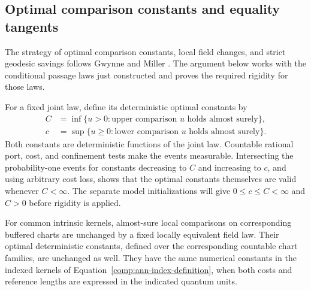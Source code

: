 \subsection{Optimal comparison constants and equality tangents}

The strategy of optimal comparison constants, local field changes,
and strict geodesic savings follows Gwynne and Miller
\cite[Section~1.5 and Sections~3--5]{GwynneMillerMetric}. The argument
below works with the conditional passage laws just constructed and
proves the required rigidity for those laws.

For a fixed joint law, define its deterministic optimal constants by
\begin{equation}\label{comp:optimal-constants}
 \begin{aligned}
 C&=\inf\{u>0:\text{upper comparison }u\text{ holds almost surely}\},\\
 c&=\sup\{u\ge0:\text{lower comparison }u\text{ holds almost surely}\}.
 \end{aligned}
\end{equation}
Both constants are deterministic functions of the joint law.
Countable rational port, cost, and confinement
tests make the events measurable.  Intersecting the probability-one
events for constants decreasing to $C$ and increasing to $c$, and
using arbitrary cost loss, shows that the optimal constants themselves
are valid whenever $C<\infty$.  The separate model initializations will
give $0\le c\le C<\infty$ and $C>0$ before rigidity is applied.

\begin{lemma}
\label{comp:comparison-transport}
For common intrinsic kernels, almost-sure local comparisons on
corresponding buffered charts are unchanged by a fixed locally
equivalent field law.  Their optimal deterministic constants, defined
over the corresponding countable chart families, are unchanged as well.
They have the same numerical constants in the
indexed kernels of Equation~\eqref{comp:ann-index-definition}, when
both costs and reference lengths are expressed in the indicated
quantum units.
\end{lemma}

